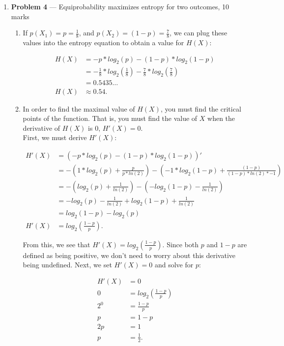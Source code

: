 \documentclass[11pt]{article}
\theoremstyle{definition}
\begin{document}
\begin{enumerate}
\begin{enumerate}
\end{enumerate}

\newpage

\item[] \textbf{Problem 4} --- Equiprobability maximizes entropy for two outcomes, 10 marks
\begin{enumerate}
\item If $p(X_1) = p = \frac{1}{8}$, and $p(X_2) = (1 - p) = \frac{7}{8}$, we can plug these values into the entropy equation to obtain a value for $H(X)$:

\begin{align*}
H(X) &= -p * log_2(p) - (1 - p) * log_2(1 - p)\\
&= -\frac{1}{8} * log_2(\frac{1}{8}) - \frac{7}{8} *  log_2(\frac{7}{8})\\
&= 0.5435 \ldots \\
H(X) &\approx 0.54.
\end{align*}

\item In order to find the maximal value of $H(X)$, you must find the critical points of the function. That is, you must find the value of $X$ when the derivative of $H(X)$
is 0, $H'(X) = 0$.\\

First, we must derive $H'(X)$:

\begin{align*}
H'(X) &= (-p * log_2(p) - (1 - p) * log_2(1 - p))'\\
&= -(1 * log_2(p) + \frac{p}{p * ln(2)}) - (-1 * log_2(1 - p) + \frac{(1 - p)}{(1 - p) * ln(2) * -1})\\
&= -(log_2(p) + \frac{1}{ln(2)}) - (-log_2(1 - p) - \frac{1}{ln(2)})\\
&= -log_2(p) - \frac{1}{ln(2)} + log_2(1 - p) + \frac{1}{ln(2)}\\
&= log_2(1 - p) - log_2(p)\\
H'(X) &= log_2(\frac{1 - p}{p}).
\end{align*}

From this, we see that $H'(X) = log_2(\frac{1 - p}{p})$. Since both $p$ and $1 - p$ are defined as being positive, we don't need to worry about this derivative being undefined.
Next, we set $H'(X) = 0$ and solve for $p$:

\begin{align*}
H'(X) &= 0\\
0 &= log_2(\frac{1 - p}{p})\\
2^0 &= \frac{1 - p}{p}\\
p &= 1 - p\\
2p &= 1\\
p &= \frac{1}{2}.
\end{align*}


\end{enumerate}
\end{enumerate}
\end{document}
